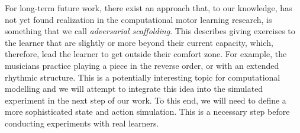 \documentclass{article}
\begin{document}
For long-term future work, there exist an approach that, to our knowledge,  has not yet found realization in the computational motor learning research, is something that  we call \textit{adversarial scaffolding}. This describes giving exercises to the learner that are slightly or more  beyond their current capacity, which, therefore, lead the learner to get outside their comfort zone.  For example, the musicians practice playing a piece in the reverse order, or with an extended rhythmic structure.  This is a potentially interesting topic for computational modelling and we will attempt to integrate this idea into the simulated  experiment in the next step of our work. To this end, we will need to define a more sophisticated state and action simulation.  This is a necessary step before conducting experiments with real learners. 











\end{document}
